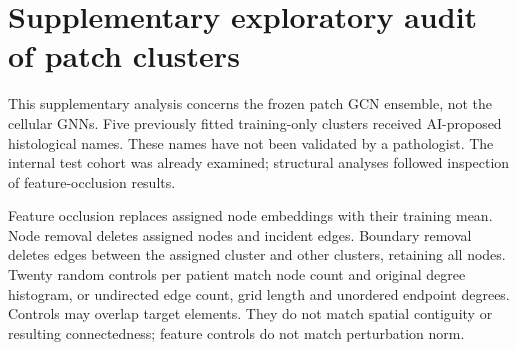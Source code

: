 \section{Supplementary exploratory audit of patch clusters}

This supplementary analysis concerns the frozen patch GCN ensemble, not the cellular GNNs. Five previously fitted training-only clusters received AI-proposed histological names. These names have not been validated by a pathologist. The internal test cohort was already examined; structural analyses followed inspection of feature-occlusion results.

Feature occlusion replaces assigned node embeddings with their training mean. Node removal deletes assigned nodes and incident edges. Boundary removal deletes edges between the assigned cluster and other clusters, retaining all nodes. Twenty random controls per patient match node count and original degree histogram, or undirected edge count, grid length and unordered endpoint degrees. Controls may overlap target elements. They do not match spatial contiguity or resulting connectedness; feature controls do not match perturbation norm.

